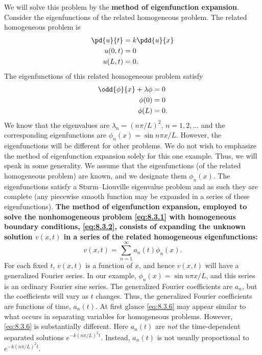 We will solve this problem by the \textbf{method of eigenfunction expansion}.  Consider the eigenfunctions of the related homogeneous problem.  The related homogeneous problem is
\begin{align}
\label{eq:8.3.4}
\pd{u}{t} &= k\pdd{u}{x} \notag\\
u(0,t) &= 0 \notag\\
u(L,t) &= 0.
\end{align}
The eigenfunctions of this related homogeneous problem satisfy
\begin{align}
\label{eq:8.3.5}
\odd{\phi}{x} + \lambda\phi &= 0 \notag\\
\phi(0) &= 0 \notag\\
\phi(L) &= 0.
\end{align}
We know that the eigenvalues are $\lambda_n = (n\pi/L)^2$, $n=1,2,\ldots$ and the corresponding eigenfunctions are $\phi_n(x) = \sin n\pi x/L$.  However, the eigenfunctions will be different for other problems.  We do not wish to emphasize the method of eigenfunction expansion solely for this one example.  Thus, we will speak in some generality.  We assume that the eigenfunctions (of the related homogeneous problem) are known, and we designate them $\phi_n(x)$.  The eigenfunctions satisfy a Sturm--Liouville eigenvalue problem and as such they are complete (any piecewise smooth function may be expanded in a series of these eigenfunctions).  \textbf{The method of eigenfunction expansion, employed to solve the nonhomogeneous problem \eqref{eq:8.3.1} with homogeneous boundary conditions, \eqref{eq:8.3.2}, consists of expanding the unknown solution $v(x,t)$ in a series of the related homogeneous eigenfunctions:}
\begin{equation}
\label{eq:8.3.6}
\boxed{v(x,t) = \sum_{n=1}^{\infty} a_n(t)\phi_n(x).}
\end{equation}
For each fixed $t$, $v(x,t)$ is a function of $x$, and hence $v(x,t)$ will have a generalized Fourier series.  In our example, $\phi_n(x) = \sin n\pi x/L$, and this series is an ordinary Fourier sine series.  The generalized Fourier coefficients are $a_n$, but the coefficients will vary as $t$ changes.  Thus, the generalized Fourier coefficients are functions of time, $a_n(t)$.  At first glance \eqref{eq:8.3.6} may appear similar to what occurs in separating variables for homogeneous problems.  However, \eqref{eq:8.3.6} is substantially different.  Here $a_n(t)$ are \emph{not} the time-dependent separated solutions $e^{-k(n\pi/L)^2 t}$.  Instead, $a_n(t)$ is not usually proportional to $e^{-k(n\pi/L)^2 t}$.

